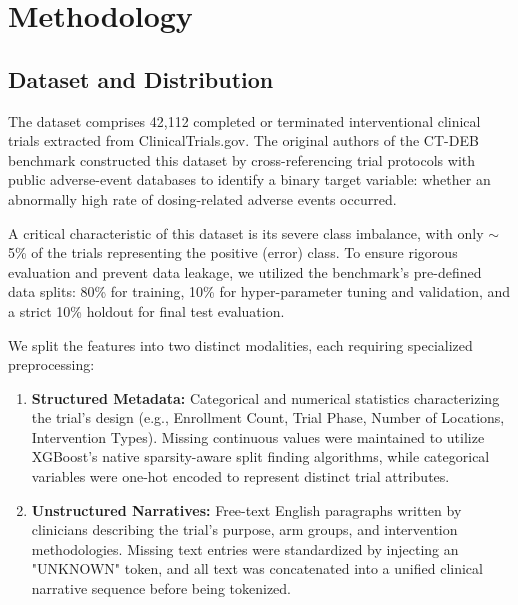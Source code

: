 \documentclass[11pt,a4paper]{article}
\begin{document}
\section{Methodology}

\subsection{Dataset and Distribution}
The dataset comprises 42,112 completed or terminated interventional clinical trials extracted from ClinicalTrials.gov. The original authors of the CT-DEB benchmark constructed this dataset by cross-referencing trial protocols with public adverse-event databases to identify a binary target variable: whether an abnormally high rate of dosing-related adverse events occurred. 

A critical characteristic of this dataset is its severe class imbalance, with only $\sim$5\% of the trials representing the positive (error) class. To ensure rigorous evaluation and prevent data leakage, we utilized the benchmark's pre-defined data splits: 80\% for training, 10\% for hyper-parameter tuning and validation, and a strict 10\% holdout for final test evaluation.

We split the features into two distinct modalities, each requiring specialized preprocessing:
\begin{enumerate}
    \item \textbf{Structured Metadata:} Categorical and numerical statistics characterizing the trial's design (e.g., Enrollment Count, Trial Phase, Number of Locations, Intervention Types). Missing continuous values were maintained to utilize XGBoost's native sparsity-aware split finding algorithms, while categorical variables were one-hot encoded to represent distinct trial attributes.
    \item \textbf{Unstructured Narratives:} Free-text English paragraphs written by clinicians describing the trial's purpose, arm groups, and intervention methodologies. Missing text entries were standardized by injecting an "UNKNOWN" token, and all text was concatenated into a unified clinical narrative sequence before being tokenized.
\end{enumerate}
\end{document}
